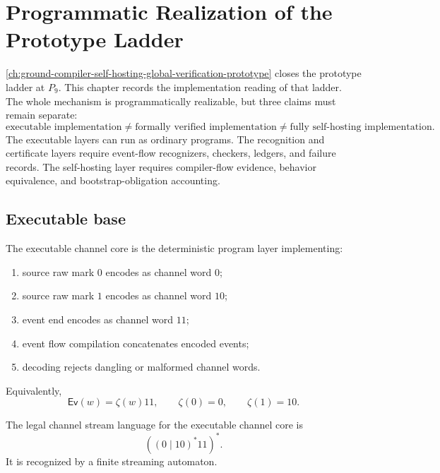 \chapter{Programmatic Realization of the Prototype Ladder}
\label{ch:ground-compiler-programmatic-realization}

\autoref{ch:ground-compiler-self-hosting-global-verification-prototype} closes the prototype ladder at $P_9$. This chapter records the implementation reading of that ladder. The whole mechanism is programmatically realizable, but three claims must remain separate:
$$
  \boxed{
    \text{executable implementation}
    \neq
    \text{formally verified implementation}
    \neq
    \text{fully self-hosting implementation}.
  }
$$
The executable layers can run as ordinary programs. The recognition and certificate layers require event-flow recognizers, checkers, ledgers, and failure records. The self-hosting layer requires compiler-flow evidence, behavior equivalence, and bootstrap-obligation accounting.

\section{Executable base}
\label{sec:programmatic-executable-base}

\begin{definition}
\label{def:programmatic-executable-channel-core}
The executable channel core is the deterministic program layer implementing:
\begin{enumerate}
\item source raw mark $0$ encodes as channel word $0$;
\item source raw mark $1$ encodes as channel word $10$;
\item event end encodes as channel word $11$;
\item event flow compilation concatenates encoded events;
\item decoding rejects dangling or malformed channel words.
\end{enumerate}
Equivalently,
$$
  \mathsf{Ev}(w)=\zeta(w)11,
  \qquad
  \zeta(0)=0,
  \qquad
  \zeta(1)=10.
$$
\end{definition}

\begin{proposition}
\label{prop:programmatic-base-language-stream-regular}
The legal channel stream language for the executable channel core is
$$
  ((0\mid 10)^*11)^*.
$$
It is recognized by a finite streaming automaton.
\end{proposition}

